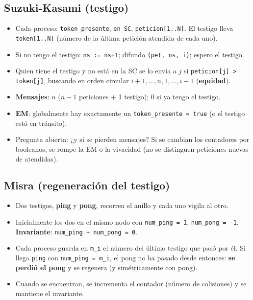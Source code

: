 \documentclass[11pt,a4paper,oneside]{report}
\begin{document}
\subsection{Suzuki-Kasami (testigo)}
\begin{itemize}[leftmargin=*]
  \item Cada proceso: \texttt{token\_presente}, \texttt{en\_SC}, \texttt{peticion[1..N]}. El testigo lleva
        \texttt{token[1..N]} (número de la última petición atendida de cada uno).
  \item Si no tengo el testigo: \texttt{ns := ns+1}; difundo \texttt{(pet, ns, i)}; espero el testigo.
  \item Quien tiene el testigo y no está en la SC se lo envía a $j$ si \texttt{peticion[j] > token[j]}, buscando en
        orden circular $i+1, \dots, n, 1, \dots, i-1$ (\textbf{equidad}).
  \item \textbf{Mensajes}: $n$ ($n-1$ peticiones + 1 testigo); 0 si ya tengo el testigo.
  \item \textbf{EM}: globalmente hay exactamente un \texttt{token\_presente = true} (o el testigo está en tránsito).
  \item Pregunta abierta: ¿y si se pierden mensajes? Si se cambian los contadores por booleanos, se rompe la EM o la
        vivacidad (no se distinguen peticiones nuevas de atendidas).
\end{itemize}

\subsection{Misra (regeneración del testigo)}
\begin{itemize}[leftmargin=*]
  \item Dos testigos, \textbf{ping} y \textbf{pong}, recorren el anillo y cada uno vigila al otro.
  \item Inicialmente los dos en el mismo nodo con \texttt{num\_ping = 1}, \texttt{num\_pong = -1}.
        \textbf{Invariante}: \texttt{num\_ping + num\_pong = 0}.
  \item Cada proceso guarda en \texttt{m\_i} el número del último testigo que pasó por él. Si llega
        \texttt{ping} con \texttt{num\_ping = m\_i}, el pong no ha pasado desde entonces: \textbf{se perdió el
        pong} y se regenera (y simétricamente con pong).
  \item Cuando se encuentran, se incrementa el contador (número de colisiones) y se mantiene el invariante.
\end{itemize}
\end{document}
